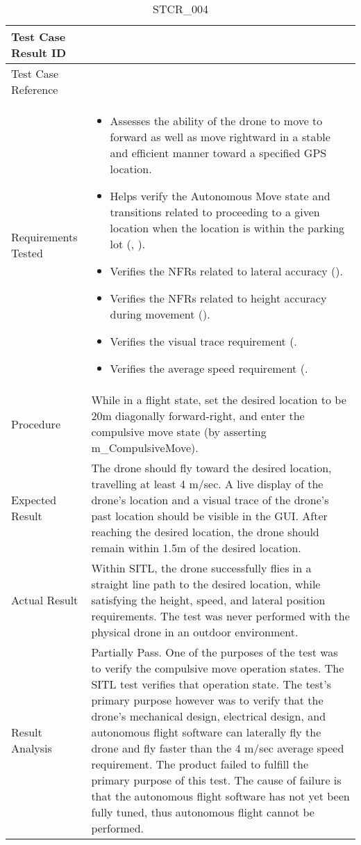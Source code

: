 \documentclass[12pt, titlepage]{article}
\begin{document}
\begin{table}[!h]
\begin{center}
\caption {STCR\_004}
\label{tab:STCR_004}
\begin{tabular}{ | m{3.2cm} | m{12.2cm} | } 
\hline
Test Case Result ID & \nameref{tab:STCR_004} \\ 
\hline
Test Case Reference & \nameref{tab:STC_004}  \\ 
\hline
Requirements Tested & \begin{itemize}
    \item Assesses the ability of the drone to move to forward as well as move rightward in a stable and efficient manner toward a specified GPS location.
    \item Helps verify the Autonomous Move state and transitions related to proceeding to a given location when the location is within the parking lot (\nameref{STA_002}, \nameref{TRANS_005}).
    \item Verifies the NFRs related to lateral accuracy (\nameref{PERF_008}). 
    \item Verifies the NFRs related to height accuracy during movement (\nameref{PERF_006}). 
    \item Verifies the visual trace requirement (\nameref{USE_001}. 
    \item Verifies the average speed requirement (\nameref{PERF_003}. 
\end{itemize}
\\ 
\hline


\hline
Procedure & While in a flight state, set the desired location to be 20m diagonally forward-right, and enter the compulsive move state (by asserting m\_CompulsiveMove).    \\ 
\hline
Expected Result & The drone should fly toward the desired location, travelling at least 4 m/sec. A live display of the drone's location and a visual trace of the drone's past location should be visible in the GUI. After reaching the desired location, the drone should remain within 1.5m of the desired location.    \\ 
\hline
Actual Result & Within SITL, the drone successfully flies in a straight line path to the desired location, while satisfying the height, speed, and lateral position requirements. The test was never performed with the physical drone in an outdoor environment. \\ 
\hline
Result Analysis & Partially Pass. One of the purposes of the test was to verify the compulsive move operation states. The SITL test verifies that operation state. The test's primary purpose however was to verify that the drone's mechanical design, electrical design, and autonomous flight software can laterally fly the drone and fly faster than the 4 m/sec average speed requirement. The product failed to fulfill the primary purpose of this test. The cause of failure is that the autonomous flight software has not yet been fully tuned, thus autonomous flight cannot be performed. \\ 
\hline
\end{tabular}
\end{center}
\end{table}
\end{document}
